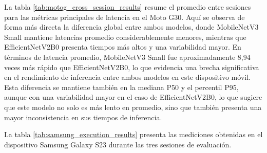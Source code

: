 La tabla \ref{tab:motog_cross_session_results} resume el promedio entre sesiones para las métricas principales de latencia en el
Moto G30. Aquí se observa de forma más directa la diferencia global entre ambos modelos, donde MobileNetV3 Small mantiene latencias promedio 
considerablemente menores, mientras que EfficientNetV2B0 presenta tiempos más altos y una variabilidad mayor. En términos de latencia promedio,
MobileNetV3 Small fue aproximadamente 8,94 veces más rápido que EfficientNetV2B0, lo que evidencia una brecha significativa en el rendimiento
de inferencia entre ambos modelos en este dispositivo móvil. Esta diferencia se mantiene también en la mediana P50 y el percentil P95, 
aunque con una variabilidad mayor en el caso de EfficientNetV2B0, lo que sugiere que este modelo no solo es más lento en promedio, sino que también
presenta una mayor inconsistencia en sus tiempos de inferencia.
\begin{table}[H]
    \centering
    \caption{Promedio entre sesiones de las métricas de ejecución en Moto G30.}
    \label{tab:motog_cross_session_results}
\end{table}

La tabla \ref{tab:samsung_execution_results} presenta las mediciones obtenidas en el dispositivo Samsung Galaxy S23 durante las tres
sesiones de evaluación. 

